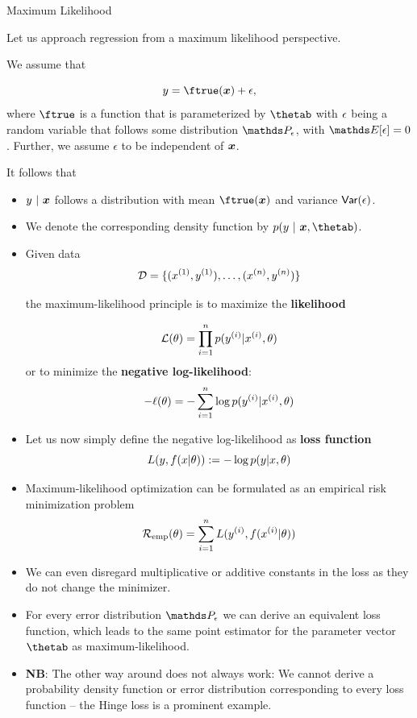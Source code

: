 \begin{vbframe}{Maximum Likelihood}

Let us approach regression from a maximum likelihood perspective. 

\lz 

We assume that 

$$
y = \ftrue(\xv) + \eps,
$$
where $\ftrue$ is a function that is parameterized by $\thetab$ with $\epsilon$ being a random variable that follows some distribution $\P_\eps$, with $\E[\eps] = 0$. Further, we assume $\epsilon$ to be independent of $\bm{x}$. 

\lz 

It follows that 
\begin{itemize}
\item $y~|~\bm{x}$ follows a distribution with mean $\ftrue(\xv)$ and variance $\mathsf{Var}(\epsilon)$. 
\item We denote the corresponding density function by $p(y~|~\xv, \thetab)$. 
\end{itemize}


\framebreak 

\begin{itemize}
\item Given data 
$$
\mathcal{D} = \{ (x^{(1)}, y^{(1)}), \ldots, (x^{(n)}, y^{(n)})\}
$$ 

the maximum-likelihood principle is to maximize the \textbf{likelihood}

$$ \mathcal{L}(\theta) = \prod_{i=1}^n p(y^{(i)} |x^{(i)}, \theta) $$
or to minimize the \textbf{negative log-likelihood}:
$$ -\ell(\theta) = -\sum_{i=1}^n \log p(y^{(i)} |x^{(i)}, \theta) $$

\framebreak 

\item Let us now simply define the negative log-likelihood as \textbf{loss function} 
$$ L(y, f(x | \theta)) := - \log p(y |x, \theta) $$
\item Maximum-likelihood optimization can be formulated as an empirical risk minimization problem
$$\mathcal{R}_{\text{emp}}(\theta) = \sum_{i=1}^n L(y^{(i)}, f(x^{(i)} | \theta))$$

\item We can even disregard multiplicative or additive constants in the loss as they do not change the minimizer.

\framebreak 

\item For every error distribution $\P_\eps$ we can derive an equivalent loss function, which leads to the same point estimator for the parameter vector $\thetab$ as maximum-likelihood.
\lz
\item \textbf{NB}: The other way around does not always work: We cannot derive a probability density function or error distribution corresponding to every loss function -- the Hinge loss is a prominent example.
\end{itemize}

\end{vbframe}


